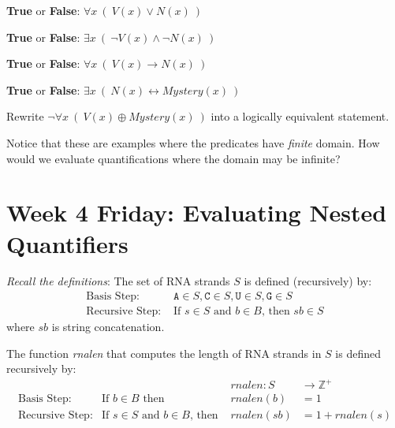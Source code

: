 \documentclass[12pt, oneside]{article}
\newcommand{\A}[0]{\texttt{A}}
\newcommand{\C}[0]{\texttt{C}}
\newcommand{\G}[0]{\texttt{G}}
\newcommand{\U}[0]{\texttt{U}}
\begin{document}
{\bf True} or {\bf False}: $\forall x~ (~V(x) \lor N(x)~)$

\vfill


{\bf True} or {\bf False}: $\exists x~ (~\lnot V(x) \land \lnot N(x)~)$

\vfill

{\bf True} or {\bf False}: $\forall x~ (~V(x) \to N(x)~)$

\vfill

{\bf True} or {\bf False}: $\exists x~ (~N(x) \leftrightarrow Mystery(x)~)$

\vfill

Rewrite $\lnot \forall x~(~V(x) \oplus Mystery(x)~)$ into a logically equivalent statement.

\vspace{50pt}


Notice that these are examples where the predicates have {\it finite} domain.
How would we evaluate quantifications where the domain may be infinite?

\vfill

 \vfill
\newpage

\section*{Week 4 Friday: Evaluating Nested Quantifiers}


{\it Recall the definitions}: The set of RNA strands $S$ is defined (recursively) by:
\[
\begin{array}{ll}
\textrm{Basis Step: } & \A \in S, \C \in S, \U \in S, \G \in S \\
\textrm{Recursive Step: } & \textrm{If } s \in S\textrm{ and }b \in B \textrm{, then }sb \in S
\end{array}
\]
where $sb$ is string concatenation.

The function \textit{rnalen} that computes the length of RNA strands in $S$ is defined recursively by:
\[
\begin{array}{llll}
& & \textit{rnalen} : S & \to \mathbb{Z}^+ \\
\textrm{Basis Step:} & \textrm{If } b \in B\textrm{ then } & \textit{rnalen}(b) & = 1 \\
\textrm{Recursive Step:} & \textrm{If } s \in S\textrm{ and }b \in B\textrm{, then  } & \textit{rnalen}(sb) & = 1 + \textit{rnalen}(s)
\end{array}
\]
\end{document}

